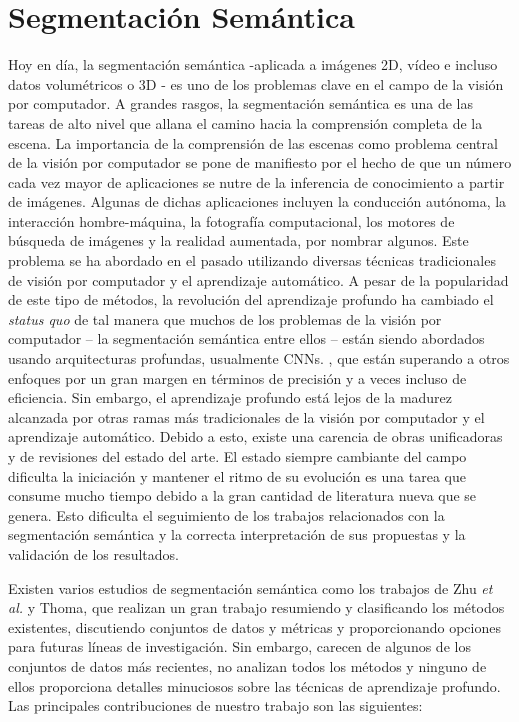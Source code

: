 \chapter{Segmentación Semántica}

Hoy en día, la segmentación semántica -aplicada a imágenes 2D, vídeo e incluso datos volumétricos o 3D - es uno de los problemas clave en el campo de la visión por computador. A grandes rasgos, la segmentación semántica es una de las tareas de alto nivel que allana el camino hacia la comprensión completa de la escena. La importancia de la comprensión de las escenas como problema central de la visión por computador se pone de manifiesto por el hecho de que un número cada vez mayor de aplicaciones se nutre de la inferencia de conocimiento a partir de imágenes. Algunas de dichas aplicaciones incluyen la conducción autónoma, la interacción hombre-máquina, la fotografía computacional, los motores de búsqueda de imágenes y la realidad aumentada, por nombrar algunos. Este problema se ha abordado en el pasado utilizando diversas técnicas tradicionales de visión por computador y el aprendizaje automático. A pesar de la popularidad de este tipo de métodos, la revolución del aprendizaje profundo ha cambiado el \emph{status quo} de tal manera que muchos de los problemas de la visión por computador -- la segmentación semántica entre ellos -- están siendo abordados usando arquitecturas profundas, usualmente \acp{CNN}. \cite{Ning2005, Ciresan2012, Farabet2013, Hariharan2014, Gupta2014}, que están superando a otros enfoques por un gran margen en términos de precisión y a veces incluso de eficiencia. Sin embargo, el aprendizaje profundo está lejos de la madurez alcanzada por otras ramas más tradicionales de la visión por computador y el aprendizaje automático. Debido a esto, existe una carencia de obras unificadoras y de revisiones del estado del arte. El estado siempre cambiante del campo dificulta la iniciación y mantener el ritmo de su evolución es una tarea que consume mucho tiempo debido a la gran cantidad de literatura nueva que se genera. Esto dificulta el seguimiento de los trabajos relacionados con la segmentación semántica y la correcta interpretación de sus propuestas y la validación de los resultados.

Existen varios estudios de segmentación semántica como los trabajos de Zhu \emph{et al.}\cite{Zhu2016} y Thoma\cite{Thoma2016}, que realizan un gran trabajo resumiendo y clasificando los métodos existentes, discutiendo conjuntos de datos y métricas y proporcionando opciones para futuras líneas de investigación. Sin embargo, carecen de algunos de los conjuntos de datos más recientes, no analizan todos los métodos y ninguno de ellos proporciona detalles minuciosos sobre las técnicas de aprendizaje profundo. Las principales contribuciones de nuestro trabajo son las siguientes:

